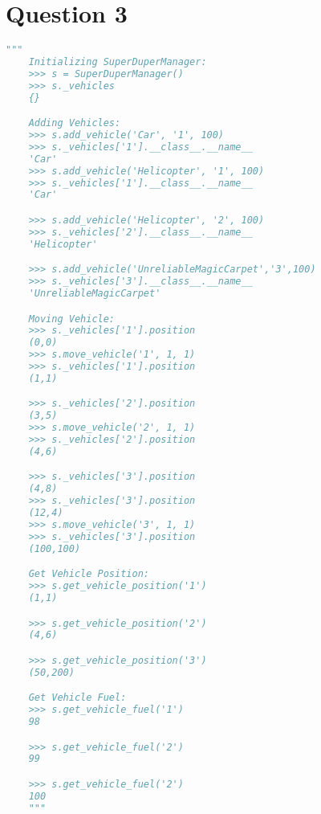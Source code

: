 \documentclass[12pt]{article}
\begin{document}
\section*{Question 3}
\begin{lstlisting}[language=Python]
    """
    Initializing SuperDuperManager:
    >>> s = SuperDuperManager()
    >>> s._vehicles
    {}

    Adding Vehicles:
    >>> s.add_vehicle('Car', '1', 100)
    >>> s._vehicles['1'].__class__.__name__
    'Car'
    >>> s.add_vehicle('Helicopter', '1', 100)
    >>> s._vehicles['1'].__class__.__name__
    'Car'

    >>> s.add_vehicle('Helicopter', '2', 100)
    >>> s._vehicles['2'].__class__.__name__
    'Helicopter'

    >>> s.add_vehicle('UnreliableMagicCarpet','3',100)
    >>> s._vehicles['3'].__class__.__name__
    'UnreliableMagicCarpet'

    Moving Vehicle:
    >>> s._vehicles['1'].position
    (0,0)
    >>> s.move_vehicle('1', 1, 1)
    >>> s._vehicles['1'].position
    (1,1)

    >>> s._vehicles['2'].position
    (3,5)
    >>> s.move_vehicle('2', 1, 1)
    >>> s._vehicles['2'].position
    (4,6)

    >>> s._vehicles['3'].position
    (4,8)
    >>> s._vehicles['3'].position
    (12,4)
    >>> s.move_vehicle('3', 1, 1)
    >>> s._vehicles['3'].position
    (100,100)

    Get Vehicle Position:
    >>> s.get_vehicle_position('1')
    (1,1)

    >>> s.get_vehicle_position('2')
    (4,6)

    >>> s.get_vehicle_position('3')
    (50,200)

    Get Vehicle Fuel:
    >>> s.get_vehicle_fuel('1')
    98

    >>> s.get_vehicle_fuel('2')
    99

    >>> s.get_vehicle_fuel('2')
    100
    """
\end{lstlisting}
\end{document}
